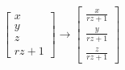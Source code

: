 \documentclass{article}
\begin{document}
\thispagestyle{empty}


$$
\begin{bmatrix}x \\ y \\ z \\ rz+1\end{bmatrix}\rightarrow
\begin{bmatrix}\frac{x}{rz+1} \\ \frac{y}{rz+1} \\ \frac{z}{rz+1} \end{bmatrix}
$$
\end{document}
